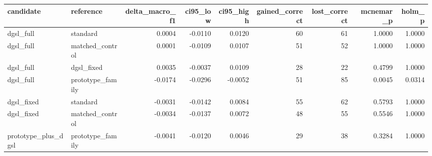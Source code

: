 \begin{tabular}{llrrrrrrr}
\toprule
candidate & reference & delta\_macro\_f1 & ci95\_low & ci95\_high & gained\_correct & lost\_correct & mcnemar\_p & holm\_p \\
\midrule
dgsl\_full & standard & 0.0004 & -0.0110 & 0.0120 & 60 & 61 & 1.0000 & 1.0000 \\
dgsl\_full & matched\_control & 0.0001 & -0.0109 & 0.0107 & 51 & 52 & 1.0000 & 1.0000 \\
dgsl\_full & dgsl\_fixed & 0.0035 & -0.0037 & 0.0109 & 28 & 22 & 0.4799 & 1.0000 \\
dgsl\_full & prototype\_family & -0.0174 & -0.0296 & -0.0052 & 51 & 85 & 0.0045 & 0.0314 \\
dgsl\_fixed & standard & -0.0031 & -0.0142 & 0.0084 & 55 & 62 & 0.5793 & 1.0000 \\
dgsl\_fixed & matched\_control & -0.0034 & -0.0137 & 0.0072 & 48 & 55 & 0.5546 & 1.0000 \\
prototype\_plus\_dgsl & prototype\_family & -0.0041 & -0.0120 & 0.0046 & 29 & 38 & 0.3284 & 1.0000 \\
\bottomrule
\end{tabular}
